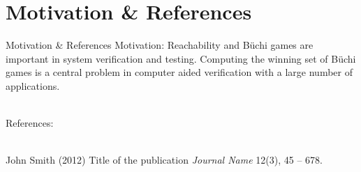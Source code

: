 

\section{Motivation \& References}
\begin{frame}{Motivation \& References}
    Motivation: Reachability and Büchi games are important in system verification and testing. Computing the winning set of Büchi games is a central problem in computer aided verification with a large number of applications.\\~
    
    References: \\~
    \footnotesize{
        \begin{thebibliography}{99}
             John Smith (2012)
            \newblock Title of the publication
            \newblock \emph{Journal Name} 12(3), 45 -- 678.
        \end{thebibliography}
    }
\end{frame}
